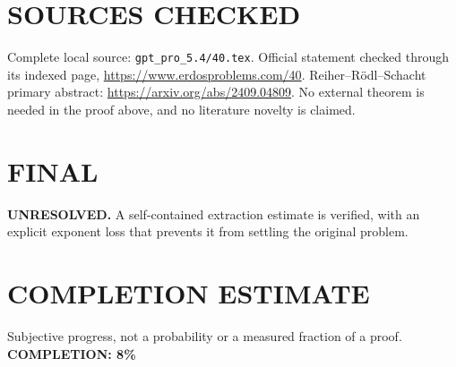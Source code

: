 \section{SOURCES CHECKED}
Complete local source: \texttt{gpt\_pro\_5.4/40.tex}. Official statement checked through its indexed page, \url{https://www.erdosproblems.com/40}. Reiher--R\"odl--Schacht primary abstract: \url{https://arxiv.org/abs/2409.04809}. No external theorem is needed in the proof above, and no literature novelty is claimed.
\section{FINAL}
\textbf{UNRESOLVED.} A self-contained extraction estimate is verified, with an explicit exponent loss that prevents it from settling the original problem.
\section{COMPLETION ESTIMATE}
Subjective progress, not a probability or a measured fraction of a proof.
\textbf{COMPLETION: 8\%}
